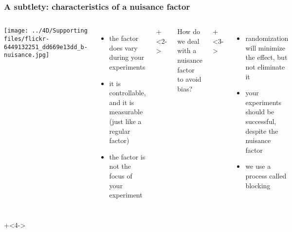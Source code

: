\begin{frame}\frametitle{A subtlety: characteristics of a nuisance factor}
	\begin{columns}[T]

			\texttt{[image: ../4D/Supporting files/flickr-6449132251\_dd669e13dd\_b-nuisance.jpg]}

					
			
		
		\begin{itemize}
			\item	the factor does vary during your experiments
			\item	it is controllable, and it is measurable (just like a regular factor)
			\item	the factor is not the focus of your experiment

		\end{itemize}
		
			\onslide+<2->{
				

				\color{myOrange} How do we deal with a nuisance factor to avoid bias?
			}
			\onslide+<3->{
				\begin{itemize}
					\item	randomization will minimize the effect, but not eliminate it
					\item	your experiments should be successful, despite the nuisance factor
					\item	we use a process called {\color{purple} blocking}
				\end{itemize}
			}			
	\end{columns}
	
	\onslide+<4->{
		\vspace{0.5cm}
		
		\hbox{\hspace{-1.5em}
		}
		
	}
\end{frame}

